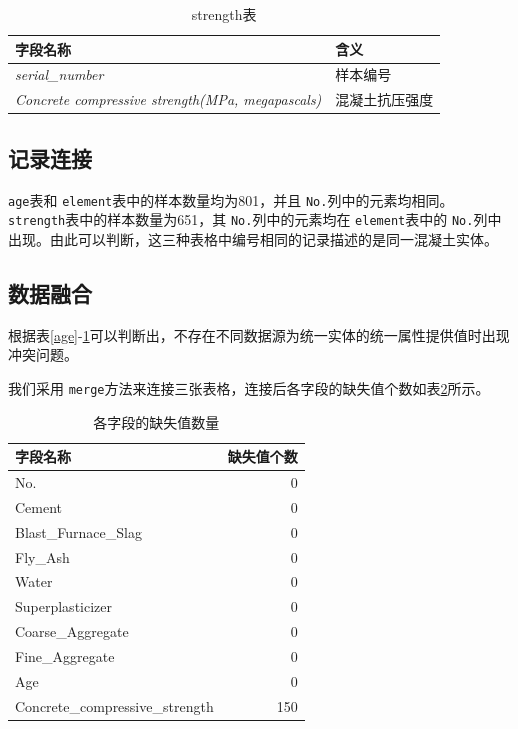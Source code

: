 \begin{table}[!h]
    \centering
 \begin{tabular}{ll}\toprule
    字段名称      &含义                 \\\midrule
   \textit{serial\_number}&样本编号                           \\
   \textit{Concrete compressive strength(MPa, megapascals) }&混凝土抗压强度                                    \\
   \bottomrule
\end{tabular}
\caption{strength表}\label{strength}
\end{table}


\subsection{记录连接}
\texttt{age}表和 \texttt{element}表中的样本数量均为801，并且 \texttt{No.}列中的元素均相同。 \texttt{strength}表中的样本数量为651，其 \texttt{No.}列中的元素均在
\texttt{element}表中的 \texttt{No.}列中出现。由此可以判断，这三种表格中编号相同的记录描述的是同一混凝土实体。
\subsection{数据融合}
根据表\ref{age}-\ref{strength}可以判断出，不存在不同数据源为统一实体的统一属性提供值时出现冲突问题。

我们采用 \texttt{merge}方法来连接三张表格，连接后各字段的缺失值个数如表\ref{null}所示。

\begin{table}[!h]
    \centering
\begin{tabular}{lr}
    \toprule
     字段名称& 缺失值个数 \\
    \midrule
    No. & 0 \\
    Cement & 0 \\
    Blast\_Furnace\_Slag & 0 \\
    Fly\_Ash & 0 \\
    Water & 0 \\
    Superplasticizer & 0 \\
    Coarse\_Aggregate & 0 \\
    Fine\_Aggregate & 0 \\
    Age & 0 \\
    Concrete\_compressive\_strength & 150 \\
    \bottomrule
\end{tabular}
\caption{各字段的缺失值数量}\label{null}
\end{table}

